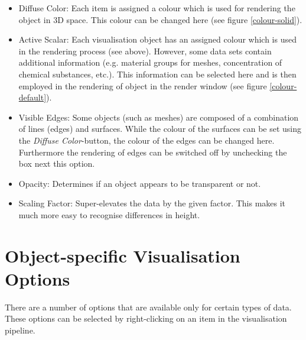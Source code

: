 \begin{itemize}
\item Diffuse Color: Each item is assigned a colour which is used for rendering the object in 3D space. This colour can be changed here (see figure \ref{colour-solid}).
\item Active Scalar: Each visualisation object has an assigned colour which is used in the rendering process (see above). However, some data sets contain additional information (e.g. material groups for meshes, concentration of chemical substances, etc.). This information can be selected here and is then employed in the rendering of object in the render window (see figure \ref{colour-default}).
\item Visible Edges: Some objects (such as meshes) are composed of a combination of lines (edges) and surfaces. While the colour of the surfaces can be set using the \emph{Diffuse Color}-button, the colour of the edges can be changed here. Furthermore the rendering of edges can be switched off by unchecking the box next this option.
\item Opacity: Determines if an object appears to be transparent or not.
\item Scaling Factor: Super-elevates the data by the given factor. This makes it much more easy to recognise differences in height.
\end{itemize}

\section{Object-specific Visualisation Options}
\label{specvisoptions}

There are a number of options that are available only for certain types of data. These options can be selected by right-clicking on an item in the visualisation pipeline.

